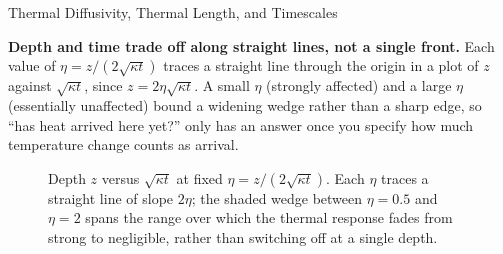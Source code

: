 \begin{activity}{Thermal Diffusivity, Thermal Length, and Timescales}
\begin{center}
\begin{tikzpicture}
  
\end{tikzpicture}
\end{center}

\textbf{Depth and time trade off along straight lines, not a single front.} Each value of $\eta = z/(2\sqrt{\kappa t})$ traces a straight line through the origin in a plot of $z$ against $\sqrt{\kappa t}$, since $z = 2\eta\sqrt{\kappa t}$. A small $\eta$ (strongly affected) and a large $\eta$ (essentially unaffected) bound a widening wedge rather than a sharp edge, so ``has heat arrived here yet?'' only has an answer once you specify how much temperature change counts as arrival.

\begin{figure}[h]
\centering
{}
\caption{Depth $z$ versus $\sqrt{\kappa t}$ at fixed $\eta = z/(2\sqrt{\kappa t})$. Each $\eta$ traces a straight line of slope $2\eta$; the shaded wedge between $\eta=0.5$ and $\eta=2$ spans the range over which the thermal response fades from strong to negligible, rather than switching off at a single depth.}
\label{fig:eta_lines}
\end{figure}

\end{activity}
